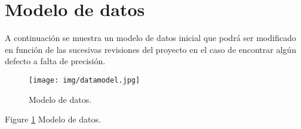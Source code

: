 \section{Modelo de datos}
\par A continuación se muestra un modelo de datos inicial que podrá ser modificado en función de las sucesivas revisiones del proyecto en el caso de encontrar algún defecto a falta de precisión.

\begin{figure}
  \centering
    \texttt{[image: img/datamodel.jpg]}
  \caption{Modelo de datos.}
  \label{fig:datamodel}
\end{figure}
Figure \ref{fig:datamodel} Modelo de datos.